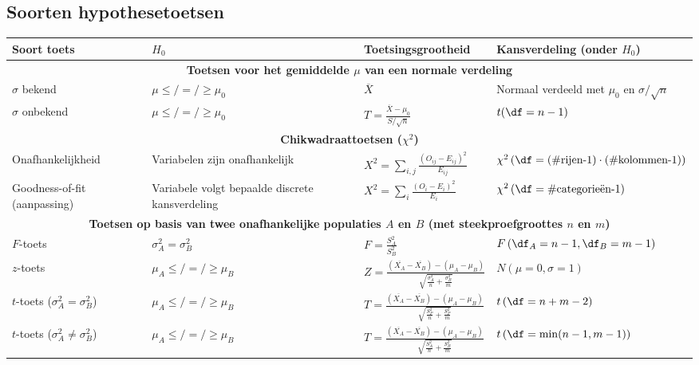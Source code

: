 \subsection*{Soorten hypothesetoetsen}
    \begin{table}[H]
        \centering
        \renewcommand{\arraystretch}{1.5}
        \begin{tabular}{m{}m{}m{}m{}}
            \toprule
                \textbf{Soort toets} & \textbf{$H_0$} & \textbf{Toetsingsgrootheid} & \textbf{Kansverdeling (onder $H_0$)} \\
            \midrule
                \multicolumn{4}{c}{\textbf{Toetsen voor het gemiddelde $\mu$ van een normale verdeling}} \\ 
            \midrule
                $\sigma$ bekend    & $\mu \leq/=/\geq \mu_0$ & $\overline{X}$ & Normaal verdeeld met $\mu_0$ en $\sigma / \sqrt{n}$ \\
                $\sigma$ onbekend  & $\mu \leq/=/\geq \mu_0$ & $T = \frac{\overline{X} - \mu_0}{S / \sqrt{n}}$ & $t(\df=n-1)$ \\
            \midrule
                \multicolumn{4}{c}{\textbf{Chikwadraattoetsen ($\chi^2$)}} \\
            \midrule
                Onafhankelijkheid & Variabelen zijn \newline onafhankelijk & $X^2 = \sum_{i,j} \frac{(O_{ij} - E_{ij})^2}{E_{ij}}$ & $\chi^2\left(\df=\text{(\#rijen-1)} \cdot \text{(\#kolommen-1)}\right)$ \\
                Goodness-of-fit \newline (aanpassing) & Variabele volgt bepaalde \newline discrete kansverdeling & $X^2 = \sum_{i} \frac{(O_{i} - E_{i})^2}{E_{i}}$ & $\chi^2\left(\df=\text{\#categorieën-1}\right)$ \\
            \midrule
                \multicolumn{4}{c}{\textbf{Toetsen op basis van twee onafhankelijke populaties $A$ en $B$ (met steekproefgroottes $n$ en $m$)}} \\
            \midrule
                $F$-toets & $\sigma_A^2 = \sigma_B^2$ & $F = \frac{S_A^2}{S_B^2}$ & $F\left(\df_A = n-1, \df_B = m-1\right)$ \\
                $z$-toets & $\mu_A \leq/=/\geq \mu_B$ & $Z = \frac{(\overline{X_A} - \overline{X_B}) - (\mu_A - \mu_B)}{\sqrt{\frac{\sigma_A^2}{n} + \frac{\sigma_B^2}{m}}}$ & $N\left(\mu=0, \sigma=1\right)$ \\
                $t$-toets ($\sigma_A^2 = \sigma_B^2$) & $\mu_A \leq/=/\geq \mu_B$ & $T = \frac{(\overline{X_A} - \overline{X_B}) - (\mu_A - \mu_B)}{\sqrt{\frac{S_P^2}{n} + \frac{S_P^2}{m}}}$ & $t\left(\df=n+m-2\right)$ \\
                $t$-toets ($\sigma_A^2 \neq \sigma_B^2$) & $\mu_A \leq/=/\geq \mu_B$ & $T = \frac{(\overline{X_A} - \overline{X_B}) - (\mu_A - \mu_B)}{\sqrt{\frac{S_A^2}{n} + \frac{S_B^2}{m}}}$ & $t\left(\df=\min(n-1, m-1)\right)$ \\
            \bottomrule
        \end{tabular}
    \end{table}



